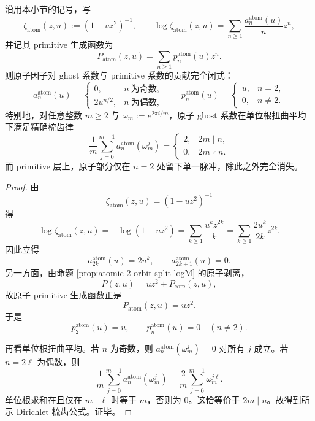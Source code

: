 \begin{theorem}\label{thm:killo-real-input-40-atomic-witt-dirichlet-comb}
沿用本小节的记号，写
\[
\zeta_{\mathrm{atom}}(z,u):=(1-uz^2)^{-1},
\qquad
\log \zeta_{\mathrm{atom}}(z,u)=\sum_{n\ge 1}\frac{a_n^{\mathrm{atom}}(u)}{n}z^n,
\]
并记其 primitive 生成函数为
\[
P_{\mathrm{atom}}(z,u)=\sum_{n\ge 1}p_n^{\mathrm{atom}}(u)z^n.
\]
则原子因子对 ghost 系数与 primitive 系数的贡献完全闭式：
\[
\boxed{
a_n^{\mathrm{atom}}(u)=
\begin{cases}
0,& n\ \text{为奇数},\\[2mm]
2u^{n/2},& n\ \text{为偶数},
\end{cases}
\qquad
p_n^{\mathrm{atom}}(u)=
\begin{cases}
u,& n=2,\\[2mm]
0,& n\neq 2.
\end{cases}}
\]
特别地，对任意整数 \(m\ge 2\) 与 \(\omega_m:=e^{2\pi i/m}\)，原子 ghost 系数在单位根扭曲平均下满足精确梳齿律
\[
\boxed{
\frac1m\sum_{j=0}^{m-1}a_n^{\mathrm{atom}}(\omega_m^j)=
\begin{cases}
2,& 2m\mid n,\\[2mm]
0,& 2m\nmid n.
\end{cases}}
\]
而 primitive 层上，原子部分仅在 \(n=2\) 处留下单一脉冲，除此之外完全消失。
\end{theorem}
\begin{proof}
由
\[
\zeta_{\mathrm{atom}}(z,u)=(1-uz^2)^{-1}
\]
得
\[
\log \zeta_{\mathrm{atom}}(z,u)
=
-\log(1-uz^2)
=
\sum_{k\ge 1}\frac{u^k z^{2k}}{k}
=
\sum_{k\ge 1}\frac{2u^k}{2k}z^{2k}.
\]
因此立得
\[
a_{2k}^{\mathrm{atom}}(u)=2u^k,
\qquad
a_{2k+1}^{\mathrm{atom}}(u)=0.
\]
另一方面，由命题 \ref{prop:atomic-2-orbit-split-logM} 的原子剥离，
\[
P(z,u)=uz^2+P_{\mathrm{core}}(z,u),
\]
故原子 primitive 生成函数正是
\[
P_{\mathrm{atom}}(z,u)=uz^2.
\]
于是
\[
p_2^{\mathrm{atom}}(u)=u,
\qquad
p_n^{\mathrm{atom}}(u)=0\quad(n\neq 2).
\]

再看单位根扭曲平均。若 \(n\) 为奇数，则 \(a_n^{\mathrm{atom}}(\omega_m^j)=0\) 对所有 \(j\) 成立。若 \(n=2\ell\) 为偶数，则
\[
\frac1m\sum_{j=0}^{m-1}a_n^{\mathrm{atom}}(\omega_m^j)
=
\frac{2}{m}\sum_{j=0}^{m-1}\omega_m^{j\ell}.
\]
单位根求和在且仅在 \(m\mid \ell\) 时等于 \(m\)，否则为 \(0\)。这恰等价于 \(2m\mid n\)。故得到所示 Dirichlet 梳齿公式。证毕。
\end{proof}
